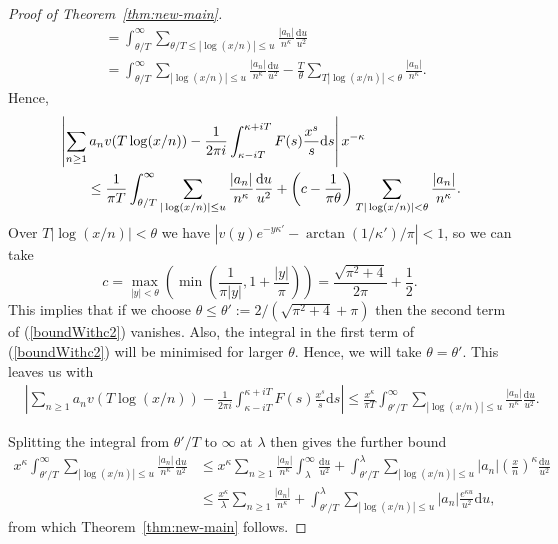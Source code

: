 \documentclass[reqno]{amsart}
\numberwithin{equation}{section}
\theoremstyle{remark}
\begin{document}
\begin{proof}[Proof of Theorem~\ref{thm:new-main}]
\begin{align*}
    &= \int_{\theta/T}^\infty \sum_{\theta/T \leq |\log(x/n)| \leq u} \frac{|a_n|}{n^\kappa} \frac{\mathrm{d}u}{u^2} \\
    &= \int_{\theta/T}^\infty \sum_{|\log(x/n)| \leq u} \frac{|a_n|}{n^\kappa} \frac{\mathrm{d}u}{u^2} - \frac{T}{\theta} \sum_{T|\log(x/n)|< \theta} \frac{|a_n|}{n^\kappa}.
\end{align*}
Hence,
\begin{align}
    &\left| \sum_{n\geq 1} a_n v(T\log(x/n)) - \frac{1}{2\pi i} \int_{\kappa-iT}^{\kappa+iT} F(s) \frac{x^s}{s} \mathrm{d}s \right| x^{-\kappa} \notag\\
    &\qquad\leq \frac{1}{\pi T} \int_{\theta/T}^\infty \sum_{|\log(x/n)| \leq u} \frac{|a_n|}{n^\kappa} \frac{\mathrm{d}u}{u^2}  +  \left(c - \frac{1}{\pi \theta} \right) \sum_{T|\log(x/n)|< \theta} \frac{|a_n|}{n^\kappa}. \label{boundWithc2}
\end{align}
Over $T|\log(x/n)|<\theta$ we have $\left| v(y)e^{-y\kappa'} - \arctan(1/\kappa')/\pi \right|<1$, so we can take
\begin{equation*}
    c = \max_{|y|<\theta} \left( \min\left( \frac{1}{\pi |y|}, 1 + \frac{|y|}{\pi} \right) \right) = \frac{\sqrt{\pi^2 + 4}}{2 \pi} + \frac{1}{2}.
\end{equation*}
This implies that if we choose $\theta\leq \theta':=2/(\sqrt{\pi^2+4}+\pi)$ then the second term of (\ref{boundWithc2}) vanishes. Also, the integral in the first term of (\ref{boundWithc2}) will be minimised for larger $\theta$. Hence, we will take $\theta = \theta'$. This leaves us with
\begin{align*}
    &\left| \sum_{n\geq 1} a_n v(T\log(x/n)) - \frac{1}{2\pi i} \int_{\kappa-iT}^{\kappa+iT} F(s) \frac{x^s}{s} \mathrm{d}s \right| \leq \frac{x^{\kappa}}{\pi T} \int_{\theta'/T}^\infty \sum_{|\log(x/n)| \leq u} \frac{|a_n|}{n^\kappa} \frac{\mathrm{d}u}{u^2}.
\end{align*}

Splitting the integral from $\theta'/T$ to $\infty$ at $\lambda$ then gives the further bound
\begin{align*}
    x^\kappa \int_{\theta'/T}^\infty \sum_{|\log(x/n)| \leq u} \frac{|a_n|}{n^\kappa} \frac{\mathrm{d}u}{u^2} &\leq x^\kappa\sum_{n\geq 1} \frac{|a_n|}{n^\kappa} \int_{\lambda}^\infty \frac{\mathrm{d}u}{u^2}  +  \int_{\theta'/T}^{\lambda} \sum_{|\log(x/n)| \leq u} |a_n| \left(\frac{x}{n}\right)^\kappa \frac{\mathrm{d}u}{u^2} \\ 
    &\leq \frac{x^\kappa}{\lambda} \sum_{n\geq 1} \frac{|a_n|}{n^\kappa}  +  \int_{\theta'/T}^{\lambda} \sum_{|\log(x/n)| \leq u} |a_n| \frac{e^{\kappa u}}{u^2} \mathrm{d}u,
\end{align*}
from which Theorem~\ref{thm:new-main} follows.
\end{proof}
\end{document}
